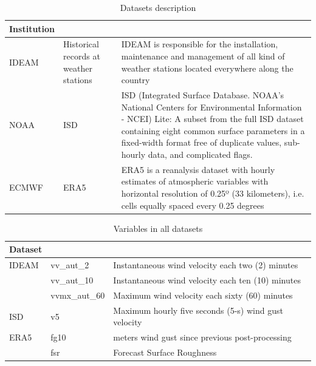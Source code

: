 \documentclass[12pt,oneside]{reedthesis}
\begin{document}
\begingroup\fontsize{10}{12}\selectfont
\begin{longtable}[t]{l>{\raggedright\arraybackslash}p{1.2in}>{\raggedright\arraybackslash}p{3.8in}}
\caption[Datasets Description]{\label{tab:tabledatasources1}Datasets description}\\
\toprule
\multicolumn{1}{l}{Institution} & \multicolumn{1}{l}{Dataset} & \multicolumn{1}{l}{Details}\\
\midrule
IDEAM & Historical records at weather stations & IDEAM is responsible for the installation, maintenance and management of all kind of weather stations located everywhere along the country\\
NOAA & ISD & ISD (Integrated Surface Database. NOAA's National Centers for Environmental Information - NCEI) Lite: A subset from the full ISD dataset containing eight common surface parameters in a fixed-width format free of duplicate values, sub-hourly data, and complicated flags.\\
ECMWF & ERA5 & ERA5 is a reanalysis dataset with hourly estimates of atmospheric variables with horizontal resolution of 0.25º (33 kilometers), i.e. cells equally spaced every 0.25 degrees\\
\bottomrule
\end{longtable}
\endgroup{}

\begingroup\fontsize{10}{12}\selectfont
\begin{longtable}[t]{l>{\raggedright\arraybackslash}p{1.2in}>{\raggedright\arraybackslash}p{3.5in}}
\caption[Datasets Variables]{\label{tab:tabledatasources2}Variables in all datasets}\\
\toprule
\multicolumn{1}{l}{Dataset} & \multicolumn{1}{l}{Variables} & \multicolumn{1}{l}{Description}\\
\midrule
IDEAM & vv\_aut\_2 & Instantaneous wind velocity each two (2) minutes\\
 & vv\_aut\_10 & Instantaneous wind velocity each ten (10) minutes\\
 & vvmx\_aut\_60 & Maximum wind velocity each sixty (60) minutes\\
ISD & v5 & Maximum hourly five seconds (5-s) wind gust velocity\\
ERA5 & fg10 & 10 meters wind gust since previous post-processing\\
\addlinespace
 & fsr & Forecast Surface Roughness\\
\bottomrule
\end{longtable}
\endgroup{}
\end{document}
